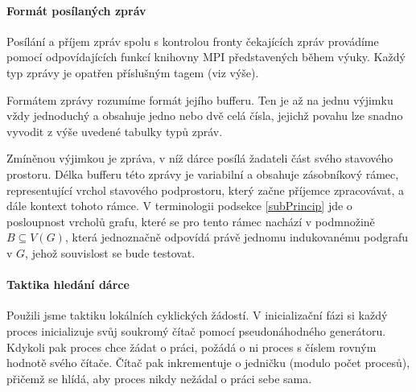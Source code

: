 \documentclass[12pt]{article}
\theoremstyle{definition}
\begin{document}
\paragraph{Formát posílaných zpráv}
Posílání a příjem zpráv spolu s kontrolou fronty čekajících zpráv provádíme
pomocí odpovídajících funkcí knihovny MPI představených během výuky. Každý typ
zprávy je opatřen příslušným tagem (viz výše).

Formátem zprávy rozumíme formát jejího bufferu. Ten je až na jednu výjimku vždy jednoduchý
a obsahuje jedno nebo dvě celá čísla, jejichž povahu lze snadno vyvodit z výše
uvedené tabulky typů zpráv.

Zmíněnou výjimkou je zpráva, v níž dárce posílá žadateli část svého stavového prostoru.
Délka bufferu této zprávy je variabilní a obsahuje zásobníkový rámec, representující
vrchol stavového podprostoru, který začne příjemce zpracovávat, a dále kontext tohoto rámce.
V terminologii podsekce \ref{subPrincip} jde o posloupnost vrcholů grafu, které se pro tento rámec nachází
v podmnožině $B\subseteq V(G)$, která jednoznačně odpovídá právě jednomu indukovanému podgrafu v $G$,
jehož souvislost se bude testovat.

\paragraph{Taktika hledání dárce}\mbox{}\newline
Použili jsme taktiku lokálních cyklických žádostí. V inicializační fázi
si každý proces inicializuje svůj soukromý čítač pomocí pseudonáhodného
generátoru. Kdykoli pak proces chce žádat o práci, požádá o ni proces s číslem
rovným hodnotě svého čítače. Čítač pak inkrementuje o jedničku (modulo počet procesů),
přičemž se hlídá, aby proces nikdy nežádal o práci sebe sama.
\end{document}
